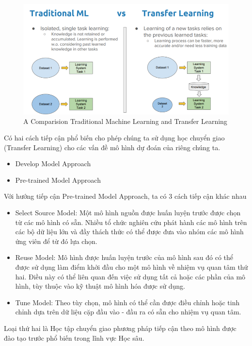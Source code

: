 \documentclass{article}
\begin{document}
	\begin{figure}[H]
		\centering
		\includegraphics[width=1\linewidth]{architecture/traditional_ml_transfer_learning.png}
		\caption{A Comparision Traditional Machine Learning and Transfer Learning}
		\label{fig:writing-thesis}
	\end{figure}
	Có hai cách tiếp cận phổ biến cho phép chúng ta sử dụng học chuyển giao (Transfer Learning) cho các vấn đề mô hình dự đoán của riêng chúng ta.
	\begin{itemize}
		\item Develop Model Approach
		\item Pre-trained Model Approach
	\end{itemize}
	Với hướng tiếp cận Pre-trained Model Approach, ta có 3 cách tiếp cận khác nhau
	\begin{itemize}
		\item Select Source Model: Một mô hình nguồn được huấn luyện trước được chọn từ các mô hình có sẵn. Nhiều tổ chức nghiên cứu phát hành các mô hình trên các bộ dữ liệu lớn và đầy thách thức có thể được đưa vào nhóm các mô hình ứng viên để từ đó lựa chọn.
		\item Reuse Model: Mô hình được huấn luyện  trước của mô hình sau đó có thể được sử dụng làm điểm khởi đầu cho một mô hình về nhiệm vụ quan tâm thứ hai. Điều này có thể liên quan đến việc sử dụng tất cả hoặc các phần của mô hình, tùy thuộc vào kỹ thuật mô hình hóa được sử dụng.
		\item Tune Model: Theo tùy chọn, mô hình có thể cần được điều chỉnh hoặc tinh chỉnh dựa trên dữ liệu cặp đầu vào - đầu ra có sẵn cho nhiệm vụ quan tâm.
	\end{itemize}
	
	Loại thứ hai là Học tập chuyển giao phương pháp tiếp cận theo mô hình được đào tạo trước phổ biến trong lĩnh vực Học sâu.
	
\end{document}
